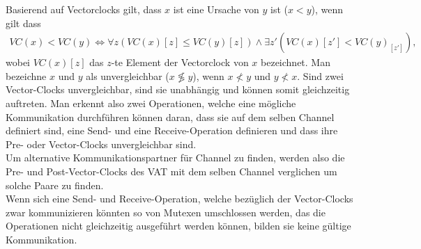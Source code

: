 Basierend auf Vectorclocks gilt, dass $x$ ist eine Ursache von $y$ ist ($x < y$), wenn gilt dass 
\begin{align}
  VC(x) < VC(y) \Leftrightarrow \forall z (VC(x)[z] \leq VC(y)[z]) \land \exists z' (VC(x)[{z'}] < VC(y)_[{z'}]),
\end{align}
wobei $VC(x)[z]$ das $z$-te Element der Vectorclock von $x$ bezeichnet.
Man bezeichne $x$ und $y$ als unvergleichbar ($x \not\lessgtr y$), wenn 
$x \not< y $ und $y \not< x$.
Sind zwei Vector-Clocks 
unvergleichbar, sind sie unabhängig und können somit gleichzeitig auftreten. 
Man erkennt also zwei Operationen, welche eine mögliche Kommunikation durchführen 
können daran, dass sie auf dem selben Channel definiert sind, eine Send-
und eine Receive-Operation definieren und dass 
 ihre Pre- oder Vector-Clocks unvergleichbar sind.\\
Um alternative Kommunikationspartner für Channel zu finden, werden also
die Pre- und Post-Vector-Clocks des VAT mit dem selben Channel verglichen um
solche Paare zu finden.\\ Wenn sich eine Send- und Receive-Operation, 
welche bezüglich der Vector-Clocks zwar kommunizieren könnten so von Mutexen 
umschlossen werden, das die Operationen nicht gleichzeitig ausgeführt werden 
können, bilden sie keine gültige Kommunikation.


